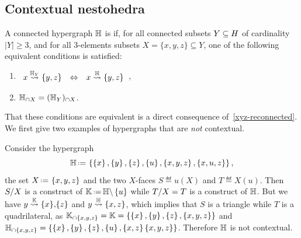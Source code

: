 
\subsection{Contextual nestohedra}

\begin{definition} 
A connected hypergraph ${\mathbb H}$ is  if, for all connected subsets $Y\subseteq H$ of cardinality $|Y|\geq 3$, and for all $3$-elements subsets $X=\{x,y,z\} \subseteq Y$, one of the following equivalent conditions is satisfied:
\begin{enumerate}
\item
$\begin{array}{lll}
  x\stackrel{{{\mathbb H}_Y}}{\rightsquigarrow}\left\{y,z\right\} & \Leftrightarrow & x\stackrel{{\mathbb H}}{\rightsquigarrow}\left\{y,z\right\}
  \end{array}$,
\item
${\mathbb H}_{\cap X} = ({\mathbb H}_Y)_{\cap X}$.
\end{enumerate}
\end{definition}
That these conditions are equivalent   is a direct consequence of~\cref{xyz-reconnected}.
We first give two examples of hypergraphs that are \emph{not} contextual.


\begin{example} 
  \label{non-contextual-1}
Consider the hypergraph 
\[
  \hyper{H}\eqdef  \set{\set{x},\set{y},\set{z},\set{u},\set{x,y,z}, \set{x,u,z}},
  \]
the set $X\eqdef \set{x,y,z}$ and the two $X$-faces $S\eqdef u(X)$ and $T\eqdef X(u)$. 
Then $S/X$ is a construct of $\hyper{K}\eqdef \restrH{H}{\set{u}}$ while $T/X=T$ is a construct of ${\mathbb H}$.
But we have $y\stackrel{{\mathbb K}}{\rightsquigarrow}\left\{x\right\}\!,\!\left\{z\right\}$ and $y\stackrel{{\mathbb H}}{\rightsquigarrow}\left\{x,z\right\}$, which implies that $S$ is a triangle while $T$ is a quadrilateral, as
${\mathbb K}_{\cap \left\{x,y,z\right\}} = {\mathbb K}  =  \left\{\left\{x\right\},\left\{y\right\},\left\{z\right\},\left\{x,y,z\right\}\right\}$ and ${\mathbb H}_{\cap \left\{x,y,z\right\}}  =  \left\{\left\{x\right\},\left\{y\right\},\left\{z\right\},\left\{u\right\},\left\{x,z\right\}\left\{x,y,z\right\}\right\}$. Therefore ${\mathbb H}$ is not contextual.
\end{example}
  
